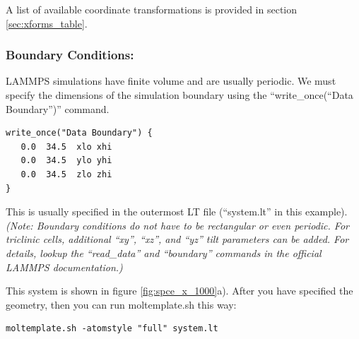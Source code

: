 \documentclass[11pt]{article}
\begin{document}
A list of available coordinate transformations 
is provided in section \ref{sec:xforms_table}.

\subsubsection*{Boundary Conditions:}
\label{sec:pbc}
LAMMPS simulations have finite volume and are usually periodic. 
We must specify the dimensions of the simulation boundary 
using the ``write\_once(``Data Boundary'')'' command.  
\begin{verbatim}
write_once("Data Boundary") {
   0.0  34.5  xlo xhi
   0.0  34.5  ylo yhi
   0.0  34.5  zlo zhi
}
\end{verbatim}
This is usually specified in the outermost LT file 
(``system.lt'' in this example).
\textit{(Note: Boundary conditions do not have to be rectangular 
or even periodic.  For triclinic cells, additional 
``xy'', ``xz'', and ``yz'' tilt parameters can be added.
For details, lookup the ``read\_data'' and ``boundary'' 
commands in the official LAMMPS documentation.)}

This system is shown in figure \ref{fig:spce_x_1000}a).
After you have specified the geometry, 
then you can run moltemplate.sh this way:
\begin{verbatim}
moltemplate.sh -atomstyle "full" system.lt
\end{verbatim}
\end{document}
